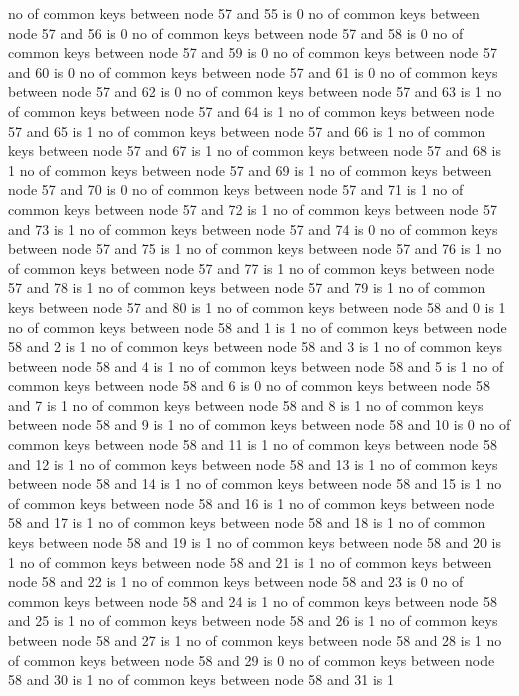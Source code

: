 no of common keys between node 57 and 55 is 0
no of common keys between node 57 and 56 is 0
no of common keys between node 57 and 58 is 0
no of common keys between node 57 and 59 is 0
no of common keys between node 57 and 60 is 0
no of common keys between node 57 and 61 is 0
no of common keys between node 57 and 62 is 0
no of common keys between node 57 and 63 is 1
no of common keys between node 57 and 64 is 1
no of common keys between node 57 and 65 is 1
no of common keys between node 57 and 66 is 1
no of common keys between node 57 and 67 is 1
no of common keys between node 57 and 68 is 1
no of common keys between node 57 and 69 is 1
no of common keys between node 57 and 70 is 0
no of common keys between node 57 and 71 is 1
no of common keys between node 57 and 72 is 1
no of common keys between node 57 and 73 is 1
no of common keys between node 57 and 74 is 0
no of common keys between node 57 and 75 is 1
no of common keys between node 57 and 76 is 1
no of common keys between node 57 and 77 is 1
no of common keys between node 57 and 78 is 1
no of common keys between node 57 and 79 is 1
no of common keys between node 57 and 80 is 1
no of common keys between node 58 and 0 is 1
no of common keys between node 58 and 1 is 1
no of common keys between node 58 and 2 is 1
no of common keys between node 58 and 3 is 1
no of common keys between node 58 and 4 is 1
no of common keys between node 58 and 5 is 1
no of common keys between node 58 and 6 is 0
no of common keys between node 58 and 7 is 1
no of common keys between node 58 and 8 is 1
no of common keys between node 58 and 9 is 1
no of common keys between node 58 and 10 is 0
no of common keys between node 58 and 11 is 1
no of common keys between node 58 and 12 is 1
no of common keys between node 58 and 13 is 1
no of common keys between node 58 and 14 is 1
no of common keys between node 58 and 15 is 1
no of common keys between node 58 and 16 is 1
no of common keys between node 58 and 17 is 1
no of common keys between node 58 and 18 is 1
no of common keys between node 58 and 19 is 1
no of common keys between node 58 and 20 is 1
no of common keys between node 58 and 21 is 1
no of common keys between node 58 and 22 is 1
no of common keys between node 58 and 23 is 0
no of common keys between node 58 and 24 is 1
no of common keys between node 58 and 25 is 1
no of common keys between node 58 and 26 is 1
no of common keys between node 58 and 27 is 1
no of common keys between node 58 and 28 is 1
no of common keys between node 58 and 29 is 0
no of common keys between node 58 and 30 is 1
no of common keys between node 58 and 31 is 1
